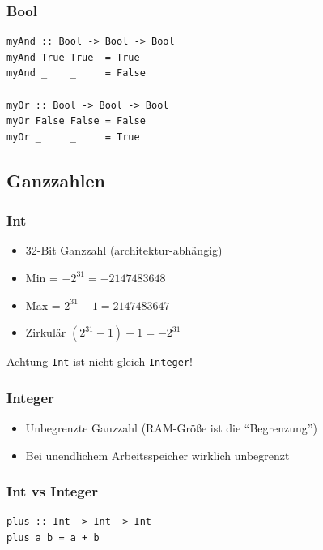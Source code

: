 \documentclass[fleqn,11pt,aspectratio=43]{beamer}
\begin{document}
\begin{frame}[fragile]
\frametitle{Bool} 
\begin{lstlisting}
myAnd :: Bool -> Bool -> Bool
myAnd True True  = True
myAnd _    _     = False

myOr :: Bool -> Bool -> Bool
myOr False False = False
myOr _     _     = True
\end{lstlisting}
\end{frame}

\subsection{Ganzzahlen}
\begin{frame}
\frametitle{Int}
\begin{block}{\vspace*{-2ex}}
\begin{itemize}
  \item 32-Bit Ganzzahl (architektur-abhängig)
  \item Min = $-2^{31} = -2147483648$
  \item Max = $2^{31} - 1 = 2147483647$
  \item Zirkulär $(2^{31} - 1) + 1 = -2^{31}$ 
\end{itemize}
\end{block}
\begin{alertblock}{Achtung}
\lstinline|Int| ist nicht gleich \lstinline|Integer|!
\end{alertblock}
\end{frame}

\begin{frame}
\frametitle{Integer}
\begin{block}{\vspace*{-2ex}}
\begin{itemize}
  \item Unbegrenzte Ganzzahl (RAM-Größe ist die "`Begrenzung"')
  \item Bei unendlichem Arbeitsspeicher wirklich unbegrenzt
\end{itemize}
\end{block}
\end{frame}

\begin{frame}[fragile]
\frametitle{Int vs Integer} 
\begin{lstlisting}
plus :: Int -> Int -> Int
plus a b = a + b
\end{lstlisting}
\end{frame}
\end{document}

